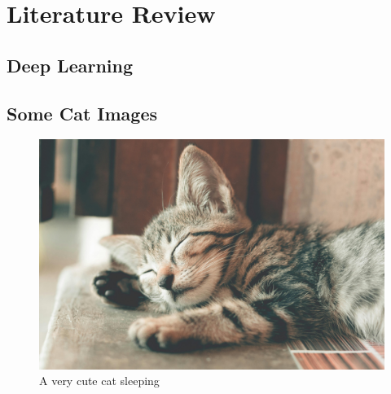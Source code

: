 \section{Literature Review}

\subsection{Deep Learning}

\lipsum[3-4]

\subsection{Some Cat Images}

\lipsum[5]

\begin{figure}[H]
    \centering
    \includegraphics[width=0.5\linewidth]{Figures/figure2.jpg}
    \caption{A very cute cat sleeping}
    \label{fig:sleeping-cat}
\end{figure}

\lipsum[12]